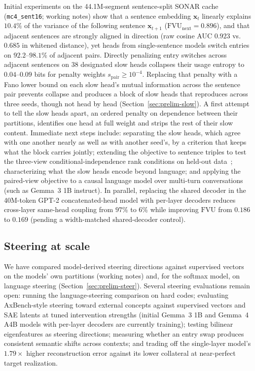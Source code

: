 Initial experiments on the 44.1M-segment sentence-split SONAR cache
(\texttt{mc4\_sent16}; working notes) show that a sentence embedding
$\mathbf{x}_t$ linearly explains $10.4\%$ of the variance of the
following sentence $\mathbf{x}_{t+1}$
($\mathrm{FVU}_{\mathrm{next}}{=}0.896$), and that adjacent sentences are
strongly aligned in direction (raw cosine AUC $0.923$ vs.\ $0.685$ in
whitened distance), yet heads from single-sentence models switch entries
on $92.2$--$98.1\%$ of adjacent pairs. Directly penalizing entry
switches across adjacent sentences on 38 designated slow heads collapses
their usage entropy to $0.04$--$0.09$ bits for penalty weights
$s_{\mathrm{pair}} \ge 10^{-4}$. Replacing that penalty with a Fano
lower bound on each slow head's mutual information across the sentence
pair prevents collapse and produces a block of slow heads that
reproduces across three seeds, though not head by head
(Section~\ref{sec:prelim-slow}). A first attempt to tell the slow heads
apart, an ordered penalty on dependence between their partitions,
identifies one head at full weight and strips the rest of their slow
content. Immediate next steps include: separating the slow heads, which
agree with one another nearly as well as with another seed's, by a
criterion that keeps what the block carries jointly; extending
the objective to sentence triples to test the three-view
conditional-independence rank conditions on held-out
data~\cite{allman2009}; characterizing what the slow heads encode beyond
language; and applying the paired-view
objective to a causal language model over multi-turn conversations (such
as Gemma~3 1B instruct). In parallel, replacing the shared decoder in
the 40M-token GPT-2 concatenated-head model with per-layer decoders
reduces cross-layer same-head coupling from $97\%$ to $6\%$ while
improving $\mathrm{FVU}$ from $0.186$ to $0.169$ (pending a
width-matched shared-decoder control).

\subsection{Steering at scale}
We have compared model-derived steering directions against supervised
vectors on the models' own partitions (working notes) and, for the
softmax model, on language steering (Section~\ref{sec:prelim-steer}).
Several steering evaluations remain open: running the language-steering
comparison on hard codes; evaluating AxBench-style steering toward
external concepts against supervised vectors and SAE latents at tuned
intervention strengths (initial Gemma~3 1B and Gemma~4 A4B models with
per-layer decoders are currently training); testing bilinear
eigenfeatures as steering directions; measuring whether an entry swap
produces consistent semantic shifts across contexts; and trading off the
single-layer model's $1.79\times$ higher reconstruction error against its
lower collateral at near-perfect target realization.

